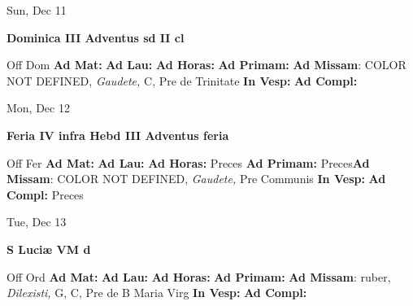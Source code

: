 \documentclass[10pt]{memoir}
\begin{document}
\begin{center}
\begin{minipage}{3.5in}
\vspace{2em}
\begin{center}Sun, Dec 11
\end{center}
\textbf{ \large Dominica III Adventus
\textnormal{\normalsize sd II cl}}

\begin{justify}Off Dom
\textbf{Ad Mat: }
\textbf{Ad Lau: }
\textbf{Ad Horas: }
\textbf{Ad Primam: }\textbf{Ad Missam}: COLOR NOT DEFINED, \textit{Gaudete,} C, Pre de Trinitate
\textbf{In Vesp: }
\textbf{Ad Compl: }
\end{justify}
\end{minipage}
\end{center}

\begin{center}
\begin{minipage}{3.5in}
\vspace{2em}
\begin{center}Mon, Dec 12
\end{center}
\textbf{ \large Feria IV infra Hebd III Adventus
\textnormal{\normalsize feria}}

\begin{justify}Off Fer
\textbf{Ad Mat: }
\textbf{Ad Lau: }
\textbf{Ad Horas: }Preces
\textbf{Ad Primam: }Preces\textbf{Ad Missam}: COLOR NOT DEFINED, \textit{Gaudete,} Pre Communis
\textbf{In Vesp: }
\textbf{Ad Compl: }Preces
\end{justify}
\end{minipage}
\end{center}

\begin{center}
\begin{minipage}{3.5in}
\vspace{2em}
\begin{center}Tue, Dec 13
\end{center}
\textbf{ \large S Luciæ VM
\textnormal{\normalsize d}}

\begin{justify}Off Ord
\textbf{Ad Mat: }
\textbf{Ad Lau: }
\textbf{Ad Horas: }
\textbf{Ad Primam: }\textbf{Ad Missam}: ruber, \textit{Dilexisti,} G, C, Pre de B Maria Virg
\textbf{In Vesp: }
\textbf{Ad Compl: }
\end{justify}
\end{minipage}
\end{center}
\end{document}
